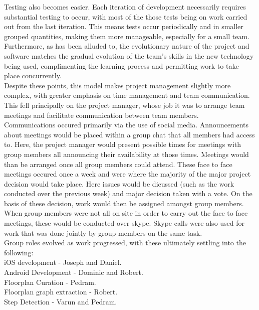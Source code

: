 \documentclass[main.tex]{subfiles}
\begin{document}
Testing also becomes easier. Each iteration of development necessarily requires substantial testing to occur, with most of the those tests being on work carried out from the last iteration. This means tests occur periodically and in smaller grouped quantities, making them more manageable, especially for a small team.\\

Furthermore, as has been alluded to, the evolutionary nature of the project and software matches the gradual evolution of the team's skills in the new technology being used, complimenting the learning process and permitting work to take place concurrently.\\

Despite these points, this model makes project management slightly more complex, with greater emphasis on time management and team communication. This fell principally on the project manager, whose job it was to arrange team meetings and facilitate communication between team members. \\

Communications occured primarily via the use of social media. Announcements about meetings would be placed within a group chat that all members had access to. Here, the project manager would present possible times for meetings with group members all announcing their availability at those times. Meetings would than be arranged once all group members could attend. These face to face meetings occured once a week and were where the majority of the major project decision would take place. Here issues would be dicussed (such as the work conducted over the previous week) and major decision taken with a vote. On the basis of these decision, work would then be assigned amongst group members. \\

When group members were not all on site in order to carry out the face to face meetings, these would be conducted over skype. Skype calls were also used for work that was done jointly by group members on the same task.\\
 
 Group roles evolved as work progressed, with these ultimately settling into the following: \\
 
 iOS development - Joseph and Daniel.\\
 Android Development - Dominic and Robert. \\
 Floorplan Curation - Pedram. \\
 Floorplan graph extraction - Robert. \\
 Step Detection - Varun and Pedram.\\
\end{document}
